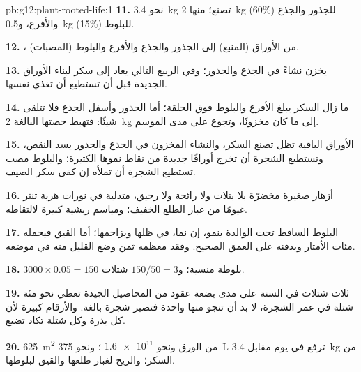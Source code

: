 \begin{solution}{pb:g12:plant-rooted-life:1}
\textbf{11.} نحو \qty{3.4}{kg} تصنع؛ منها \qty{2}{kg} (60\%) للجذور
والجذع والأفرع، و\qty{0.5}{kg} (15\%) للبلوط.

\textbf{12.} ، من الأوراق (المنبع) إلى الجذور والجذع والأفرع
والبلوط (المصبات).

\textbf{13.} يخزن نشاءً في الجذع والجذور؛ وفي الربيع التالي يعاد إلى
سكر لبناء الأوراق الجديدة قبل أن تستطيع أن تغذي نفسها.

\textbf{14.} ما زال السكر يبلغ الأفرع والبلوط فوق الحلقة؛ أما الجذور
وأسفل الجذع فلا تتلقى شيئًا: فتهبط حصتها البالغة \qty{2}{kg} إلى ما
كان مخزونًا، وتجوع على مدى الموسم.

\textbf{15.} الأوراق الباقية تظل تصنع السكر، والنشاء المخزون في الجذع
والجذور يسد النقص، وتستطيع الشجرة أن تخرج أوراقًا جديدة من نقاط نموها
الكثيرة؛ والبلوط مصب تستطيع الشجرة أن تملأه إن كفى سكر الصيف.

\textbf{16.} أزهار صغيرة مخضرّة بلا بتلات ولا رائحة ولا رحيق، متدلية
في نورات هرية تنثر غيومًا من غبار الطلع الخفيف؛ ومياسم ريشية كبيرة
لالتقاطه.

\textbf{17.} البلوط الساقط تحت الوالدة ينمو، إن نما، في ظلها ويزاحمها؛
أما القيق فيحمله مئات الأمتار ويدفنه على العمق الصحيح. وفقد معظمه ثمن
وضع القليل منه في موضعه.

\textbf{18.} $3000 \times 0.05 = 150$ بلوطة منسية؛ و$150/50 = 3$
شتلات.

\textbf{19.} ثلاث شتلات في السنة على مدى بضعة عقود من المحاصيل الجيدة
تعطي نحو مئة شتلة في عمر الشجرة، لا بد أن تنجو منها واحدة فتصير شجرة بالغة.
والأرقام كبيرة لأن كل بذرة وكل شتلة تكاد تضيع.

\textbf{20.} \qty{625}{m^2} من الورق ونحو $\num{1.6e11}$ ؛ ونحو
\qty{375}{L} ترفع في يوم مقابل \qty{3.4}{kg} من السكر؛ والريح لغبار طلعها
والقيق لبلوطها.
\end{solution}
